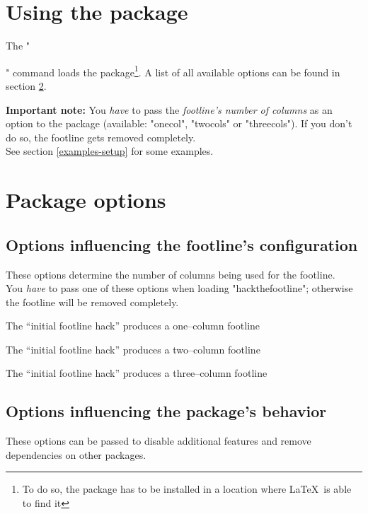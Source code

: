 \documentclass[11pt]{ltxdoc}
\begin{document}
	
	
	\clearpage




	\section{Using the package}
	The "\usepackage[<Options>]{hackthefootline}" command loads the package\footnote{To do so, the package has to be installed in a location where \LaTeX\ is able to find it}. A list of all available options can be found in section \ref{packageoptions}.
	
	\medskip
	\textbf{Important note:} You \emph{have} to pass the \emph{footline's number of columns} as an option to the package (available: "onecol", "twocols" or "threecols"). If you don't do so, the footline gets removed completely. \\
	See section \ref{examples-setup} for some examples.
	
	
	
	\section{Package options} \label{packageoptions}
	\subsection{Options influencing the footline's configuration}
	These options determine the number of columns being used for the footline. \\
	You \emph{have} to pass one of these options when loading "hackthefootline"; otherwise the footline will be removed completely.
	
	\medskip
	The \enquote{initial footline hack} produces a one--column footline
	
	\medskip
	The \enquote{initial footline hack} produces a two--column footline
	
	\medskip
	The \enquote{initial footline hack} produces a three--column footline
	
	\subsection{Options influencing the package's behavior} \label{behavioropts}
	These options can be passed to disable additional features and remove dependencies on other packages.
	
\end{document}

